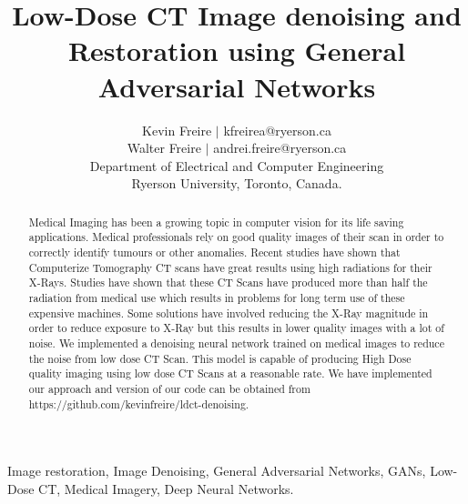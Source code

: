 \documentclass[journal]{IEEEtran}
\begin{document}
\title{Low-Dose CT Image denoising and Restoration using General Adversarial Networks}

\author{Kevin Freire $|$ kfreirea@ryerson.ca\\
Walter Freire $|$ andrei.freire@ryerson.ca \\
Department of Electrical and Computer Engineering\\
Ryerson University, Toronto, Canada.}
\maketitle

\begin{abstract}
Medical Imaging has been a growing topic in computer vision for its life saving applications.  Medical professionals rely on good quality images of their scan in order to correctly identify tumours or other anomalies.  Recent studies have shown that Computerize Tomography CT scans have great results using high radiations for their X-Rays.  Studies have shown that these CT Scans have produced more than half the radiation from medical use which results in problems for long term use of these expensive machines.  Some solutions have involved reducing the X-Ray magnitude in order to reduce exposure to X-Ray but this results in lower quality images with a lot of noise.  We implemented a denoising neural network trained on medical images to reduce the noise from low dose CT Scan.  This model is capable of producing High Dose quality imaging using low dose CT Scans at a reasonable rate.  We have implemented our approach and version of our code can be obtained from https://github.com/kevinfreire/ldct-denoising.
\end{abstract}

\begin{IEEEkeywords}
Image restoration, Image Denoising, General Adversarial Networks, GANs, Low-Dose CT, Medical Imagery, Deep Neural Networks.
\end{IEEEkeywords}

\end{document}
